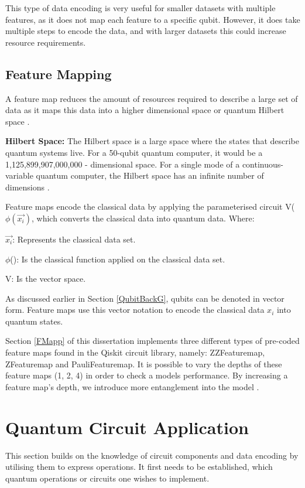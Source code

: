 This type of data encoding is very useful for smaller datasets with multiple features, as it does not map each feature to a specific qubit. However, it does take multiple steps to encode the data, and with larger datasets this could increase resource requirements.  


\subsection{Feature Mapping}\label{FMapBack}
A feature map reduces the amount of resources required to describe a large set of data as it maps this data into a higher dimensional space or quantum Hilbert space \citep{rodneyD}.

\textbf{Hilbert Space:} The Hilbert space is a large space where the states that describe quantum systems live. For a 50-qubit quantum computer, it would be a 1,125,899,907,000,000 - dimensional space. For a single mode of a continuous-variable quantum computer, the Hilbert space has an infinite number of dimensions \citep{mariaS}.

Feature maps encode the classical data by applying the parameterised circuit V($\phi(\overrightarrow{x_i})$, which converts the classical data into quantum data. Where:
 
 $\overrightarrow{x_i}$: Represents the classical data set. 
 
 $\phi$(): Is the classical function applied on the classical data set. 
 
 V: Is the vector space. 
 
 As discussed earlier in Section \ref{QubitBackG}, qubits can be denoted in vector form. Feature maps use this vector notation to encode the classical data $x_i$ into quantum states. 
 
  Section \ref{FMapp} of this dissertation implements three different types of pre-coded feature maps found in the Qiskit circuit library, namely: ZZFeaturemap, ZFeaturemap and PauliFeaturemap. It is possible to vary the depths of these feature maps (1, 2, 4) in order to check a models performance. By increasing a feature map’s depth, we introduce more entanglement into the model \citep{rodneyD}. 

\section{Quantum Circuit Application}
This section builds on the knowledge of circuit components and data encoding by utilising them to express operations. It first needs to be established, which quantum operations or circuits one wishes to implement. 


